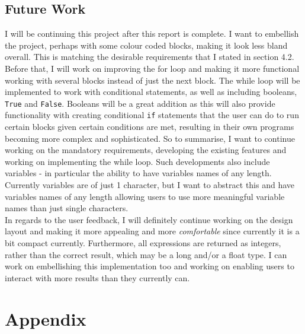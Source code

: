 \documentclass[a4paper, 12pt]{article}
\begin{document}
    \subsection{Future Work}
        I will be continuing this project after this report is complete. I want to embellish
        the project, perhaps with some colour coded blocks, making it look less bland overall.
        This is matching the desirable requirements that I stated in section 4.2. Before that,
        I will work on improving the for loop and making it more functional working with
        several blocks instead of just the next block. The while loop will be implemented
        to work with conditional statements, as well as including booleans, \texttt{True} and
        \texttt{False}. Booleans will be a great addition as this will also provide functionality
        with creating conditional \texttt{if} statements that the user can do to run certain
        blocks given certain conditions are met, resulting in their own programs becoming
        more complex and sophisticated. So to summarise, I want to continue working on the
        mandatory requirements, developing the existing features and working on implementing
        the while loop. Such developments also include variables - in particular the ability
        to have variables names of any length. Currently variables are of just 1 character,
        but I want to abstract this and have variables names of any length allowing users to
        use more meaningful variable names than just single characters. \\

        In regards to the user feedback, I will definitely continue working on the design layout
        and making it more appealing and more \textit{comfortable} since currently it is a bit
        compact currently. Furthermore, all expressions are returned as integers, rather than
        the correct result, which may be a long and/or a float type. I can work on embellishing
        this implementation too and working on enabling users to interact with more results than
        they currently can.

    
    \clearpage
    \section{Appendix}
\end{document}
